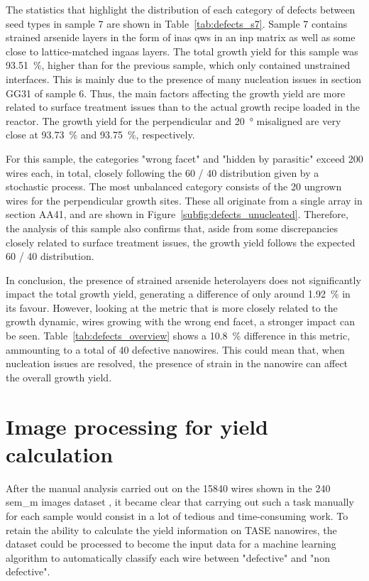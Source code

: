 The statistics that highlight the distribution of each category of defects between seed types in sample 7 are shown in Table~\ref{tab:defects_s7}. Sample 7 contains strained arsenide layers in the form of \acs{inas} \acl{qw}s in an \acs{inp} matrix as well as some close to lattice-matched \acs{ingaas} layers. The total growth yield for this sample was \qty{93.51}{\%}, higher than for the previous sample, which only contained unstrained interfaces. This is mainly due to the presence of many nucleation issues in section GG31 of sample 6. Thus, the main factors affecting the growth yield are more related to surface treatment issues than to the actual growth recipe loaded in the reactor. The growth yield for the perpendicular and \qty{20}{\degree} misaligned are very close at \qty{93.73}{\%} and \qty{93.75}{\%}, respectively.

For this sample, the categories "wrong facet" and "hidden by parasitic" exceed 200 wires each, in total, closely following the \num{60} / \num{40} distribution given by a stochastic process. The most unbalanced category consists of the \num{20} ungrown wires for the perpendicular growth sites. These all originate from a single array in section AA41, and are shown in Figure~\ref{subfig:defects_unucleated}. Therefore, the analysis of this sample also confirms that, aside from some discrepancies closely related to surface treatment issues, the growth yield follows the expected \num{60} / \num{40} distribution. 

In conclusion, the presence of strained arsenide heterolayers does not significantly impact the total growth yield, generating a difference of only around \qty{1.92}{\percent} in its favour. However, looking at the metric that is more closely related to the growth dynamic, wires growing with the wrong end facet, a stronger impact can be seen. Table~\ref{tab:defects_overview} shows a \qty{10.8}{\percent} difference in this metric, ammounting to a total of \num{40} defective nanowires. This could mean that, when nucleation issues are resolved, the presence of strain in the nanowire can affect the overall growth yield.

\section{Image processing for yield calculation}

After the manual analysis carried out on the \num{15840} wires shown in the \num{240} \acs{sem_m} images dataset \cite{dataset}, it became clear that carrying out such a task manually for each sample would consist in a lot of tedious and time-consuming work. To retain the ability to calculate the yield information on \acs{TASE} nanowires, the dataset could be processed to become the input data for a machine learning algorithm to automatically classify each wire between "defective" and "non defective". 


